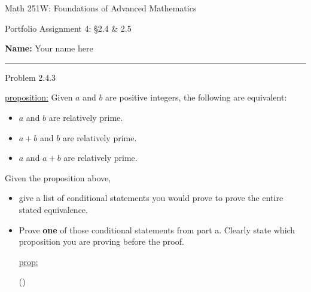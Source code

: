 \documentclass{article}
\theoremstyle{definition}
\begin{document}
	\begin{center}
		\Large{Math 251W: Foundations of Advanced Mathematics}

		\normalsize{Portfolio Assignment 4: \S 2.4 \& 2.5}

		\vspace{0.2cm}

		\hfill {\bf Name:} Your name here

		\vspace{0.25cm}
		\hrule
	\end{center}

	\vspace{0.3cm}

	\noindent Problem 2.4.3  \vspace{0.3cm}

	\underline{proposition:} Given $a$ and $b$ are positive integers,
	the following are equivalent:
	\begin{itemize}
		\item[i] $a$ and $b$ are relatively prime.
		\item[ii] $a+b$ and $b$ are relatively prime.
		\item[iii] $a$ and $a+b$ are relatively prime.
	\end{itemize}

	\medskip

	Given the proposition above,
	\begin{itemize}
		\item[a.] give a list of conditional statements you would prove to prove the entire stated equivalence.
		\medskip
		\item[b.] Prove \textbf{one} of those conditional statements from part a. Clearly state which proposition you are proving before the proof.

		\underline{prop:}

		()
	\end{itemize}



	\vspace{0.4cm}





	\vspace{1cm}



\end{document}
